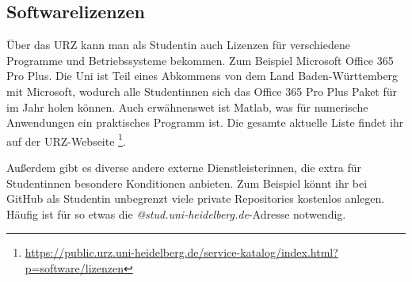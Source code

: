 \subsection{Softwarelizenzen}

Über das URZ kann man als Studentin auch Lizenzen für verschiedene Programme und Betriebssysteme bekommen. Zum Beispiel Microsoft Office 365 Pro Plus. Die Uni ist Teil eines Abkommens von dem Land Baden-Württemberg mit Microsoft, wodurch alle Studentinnen sich das Office 365 Pro Plus Paket für  im Jahr holen können. Auch erwähnenswet ist Matlab, was für numerische Anwendungen ein praktisches Programm ist. Die gesamte aktuelle Liste findet ihr auf der URZ-Webseite \footnote{\url{https://public.urz.uni-heidelberg.de/service-katalog/index.html?p=software/lizenzen}}.

Außerdem gibt es diverse andere externe Dienstleisterinnen, die extra für Studentinnen besondere Konditionen anbieten. Zum Beispiel könnt ihr bei GitHub als Studentin unbegrenzt viele private Repositories kostenlos anlegen. Häufig ist für so etwas die \emph{@stud.uni-heidelberg.de}-Adresse notwendig.
